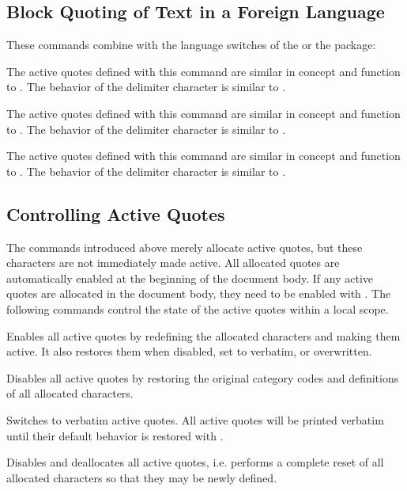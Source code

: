 \documentclass{ltxdockit}[2010/09/26]
\begin{document}
\subsection{Block Quoting of Text in a Foreign Language}
\label{act:blk:bbl}

These commands combine  with the language switches of the  or the  package:

\begin{ltxsyntax}


The active quotes defined with this command are similar in concept and function to . The behavior of the delimiter character is similar to .


The active quotes defined with this command are similar in concept and function to . The behavior of the delimiter character is similar to .


The active quotes defined with this command are similar in concept and function to . The behavior of the delimiter character is similar to .

\end{ltxsyntax}

\subsection{Controlling Active Quotes}
\label{act:ctl}

The commands introduced above merely allocate active quotes, but these characters are not immediately made active. All allocated quotes are automatically enabled at the beginning of the document body. If any active quotes are allocated in the document body, they need to be enabled with . The following commands control the state of the active quotes within a local scope.

\begin{ltxsyntax}

Enables all active quotes by redefining the allocated characters and making them active. It also restores them when disabled, set to verbatim, or overwritten.

Disables all active quotes by restoring the original category codes and definitions of all allocated characters.

Switches to verbatim active quotes. All active quotes will be printed verbatim until their default behavior is restored with .

Disables and deallocates all active quotes, i.e. performs a complete reset of all allocated characters so that they may be newly defined.

\end{ltxsyntax}
\end{document}
